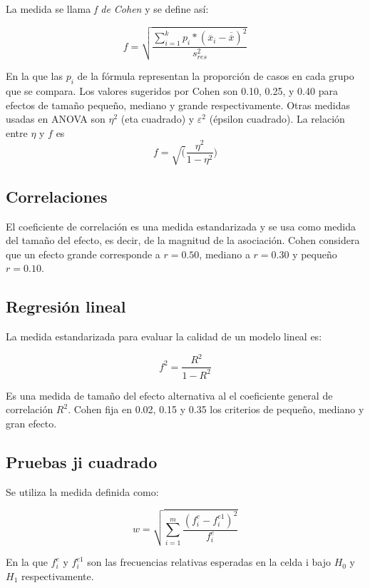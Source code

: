 \documentclass[]{book}
\begin{document}
La medida se llama \emph{f de Cohen} y se define así:

\[f = \sqrt{\frac{\sum_{i = 1}^{k}{p_{i}*{({\overline{x}}_{i} - \overline{\overline{x}})}^{2}}}{s_{res}^{2}}}\]

En la que las \(p_{i}\) de la fórmula representan la proporción de casos
en cada grupo que se compara. Los valores sugeridos por Cohen son 0.10,
0.25, y 0.40 para efectos de tamaño pequeño, mediano y grande
respectivamente. Otras medidas usadas en ANOVA son \(\eta^{2}\) (eta
cuadrado) y \(\varepsilon^{2}\) (épsilon cuadrado). La relación entre \(\eta\) y \(f\) es \[f=\sqrt(\frac{\eta^2}{1-\eta^2})\]

\hypertarget{correlaciones}{%
\subsection{Correlaciones}\label{correlaciones}}

El coeficiente de correlación es una medida estandarizada y se usa como
medida del tamaño del efecto, es decir, de la magnitud de la asociación.
Cohen considera que un efecto grande corresponde a \(r = 0.50\), mediano a
\(r = 0.30\) y pequeño \(r = 0.10\).

\hypertarget{regresiuxf3n-lineal}{%
\subsection{Regresión lineal}\label{regresiuxf3n-lineal}}

La medida estandarizada para evaluar la calidad de un modelo lineal es:

\[f^{2} = \frac{R^{2}}{1 - R^{2}}\]

Es una medida de tamaño del efecto alternativa al el coeficiente general
de correlación \(R^{2}\). Cohen fija en 0.02, 0.15 y 0.35 los criterios de
pequeño, mediano y gran efecto.

\hypertarget{pruebas-ji-cuadrado}{%
\subsection{Pruebas ji cuadrado}\label{pruebas-ji-cuadrado}}

Se utiliza la medida definida como:

\[w = \sqrt{\sum_{i = 1}^{m}\frac{{(f_{i}^{e} - f_{i}^{e1})}^{2}}{f_{i}^{e}}}\]

En la que \(f_{i}^{e}\) y \(f_{i}^{e1}\) son las frecuencias relativas
esperadas en la celda i bajo \(H_0\) y \(H_1\) respectivamente.
\end{document}
